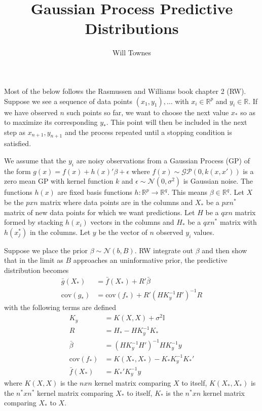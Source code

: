 \documentclass[12pt]{article}
\newcommand{\cov}{\text{cov}}
\newcommand{\GP}{\mathcal{GP}}
\begin{document}
\title{Gaussian Process Predictive Distributions}
\author{Will Townes}
\maketitle

Most of the below follows the Rasmussen and Williams book chapter 2 (RW). Suppose we see a sequence of data points $(x_1,y_1),\ldots$ with $x_i\in\mathbb{R}^p$ and $y_i\in\mathbb{R}$. If we have observed $n$ such points so far, we want to choose the next value $x_*$ so as to maximize its corresponding $y_*$. This point will then be included in the next step as $x_{n+1},y_{n+1}$ and the process repeated until a stopping condition is satisfied.

We assume that the $y_i$ are noisy observations from a Gaussian Process (GP) of the form $g(x)=f(x)+h(x)'\beta+\epsilon$ where $f(x)\sim\GP(0,k(x,x'))$ is a zero mean GP with kernel function $k$ and $\epsilon\sim\mathcal{N}(0,\sigma^2)$ is Gaussian noise. The functions $h(x)$ are fixed basis functions $h:\mathbb{R}^p\to\mathbb{R}^q$. This means $\beta\in\mathbb{R}^q$. Let $X$ be the $pxn$ matrix where data points are in the columns and $X_*$ be a $pxn^*$ matrix of new data points for which we want predictions. Let $H$ be a $qxn$ matrix formed by stacking $h(x_i)$ vectors in the columns and $H_*$ be a $qxn^*$ matrix with $h(x_j^*)$ in the columns. Let $y$ be the vector of $n$ observed $y_i$ values.

Suppose we place the prior $\beta\sim\mathcal{N}(b,B)$. RW integrate out $\beta$ and then show that in the limit as $B$ approaches an uninformative prior, the predictive distribution becomes
\begin{align*}
\bar{g}(X_*) &= \bar{f}(X_*)+R'\bar{\beta}\\
\cov(g_*) &= \cov(f_*) + R'(HK_y^{-1}H')^{-1}R
\end{align*}
with the following terms are defined
\begin{align*}
K_y &= K(X,X)+\sigma^2\mathbb{I}\\
R &= H_* - HK_y^{-1} K_*\\
\bar{\beta} &= \left(HK_y^{-1}H'\right)^{-1}HK_y^{-1}y\\
\cov(f_*) &= K(X_*,X_*) - K_*K_y^{-1}K_*'\\
\bar{f}(X_*) &= K_*'K_y^{-1}y
\end{align*}
where $K(X,X)$ is the $nxn$ kernel matrix comparing $X$ to itself, $K(X_*,X_*)$ is the $n^*xn^*$ kernel matrix comparing $X_*$ to itself, $K_*$ is the $n^*xn$ kernel matrix comparing $X_*$ to $X$.
\end{document}
